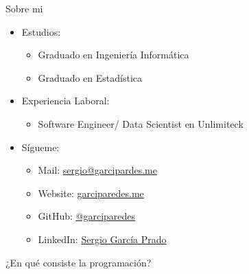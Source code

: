 \documentclass{beamer}
\begin{document}
\begin{frame}{Sobre mi}
\begin{minipage}{.74\textwidth}
\begin{itemize}
            \item Estudios:
            \begin{itemize}
              \item [\emoji{desktop-computer}] Graduado en Ingeniería Informática
              \item [\emoji{chart-increasing}] Graduado en Estadística
            \end{itemize}
            \item Experiencia Laboral:
            \begin{itemize}
              \item [\emoji{rocket}] Software Engineer/ Data Scientist en Unlimiteck
            \end{itemize}
            \item Sígueme:
                \begin{itemize}
                    \item Mail: \href{mailto:sergio@garcipardes.me}{sergio@garcipardes.me}
                    \item Website: \href{http://garciparedes.me}{garciparedes.me}
                    \item GitHub: \href{http://github.com/garciparedes}{@garciparedes}
                    \item LinkedIn: \href{https://www.linkedin.com/in/garciparedes/}{Sergio García Prado}
                \end{itemize}
          \end{itemize}
      \end{minipage}
    \end{frame}

    \begin{frame}{¿En qué consiste la programación?}
      \noindent
      \begin{minipage}{.69\textwidth}
      \end{minipage}
      \begin{minipage}{.29\textwidth}
          \begin{center}
            \fontsize{40}{50}
          \end{center}
      \end{minipage}
    \end{frame}
\end{document}
